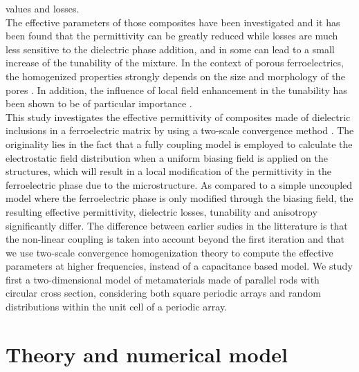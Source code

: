 \documentclass[openacc]{rsproca_new}%
\begin{document}
\maketitle
\noindent values and losses.\\
The effective parameters of those composites have been investigated \cite{sherman_ferroelectric-dielectric_2006, jylha_tunability_2008, sherman_tunability_2004, astafiev_can_2003} and it has been found that the
permittivity can be greatly reduced while losses are much less sensitive to the dielectric phase addition, and in some can lead to a small increase of the tunability of the mixture. In the context of porous ferroelectrics, the homogenized properties strongly depends on the size and morphology of the pores \cite{okazaki_effects_1973,stanculescu_study_2015}. In addition, the influence
of local field enhancement in the tunability has been shown to be of particular importance \cite{padurariu_tailoring_2012,padurariu_field-dependent_2012,cazacu_tunable_2013}.
\\
This study investigates the effective permittivity of composites made of dielectric inclusions in a ferroelectric matrix
by using a two-scale convergence method \cite{allaire_homogenization_1992, guenneau_homogenization_2000}.
The originality lies in the fact that a fully coupling model is employed to
calculate the electrostatic field distribution when a uniform biasing field is
applied on the structures, which will result in a local modification of the permittivity
in the ferroelectric phase due to the microstructure. As compared to a simple uncoupled model where the
ferroelectric phase is only modified through the biasing field,
the resulting effective permittivity, dielectric losses, tunability and
anisotropy significantly differ. The difference between earlier sudies in the litterature \cite{padurariu_tailoring_2012,padurariu_field-dependent_2012} is that the non-linear coupling is taken into account beyond the first iteration and that we use two-scale
convergence homogenization theory to compute the effective parameters at higher frequencies, instead of a capacitance based model.
We study first a two-dimensional model of metamaterials made of parallel rods with circular cross section,
considering both square periodic arrays and random distributions within the unit cell of
a periodic array.



\section{Theory and numerical model}
\end{document}
